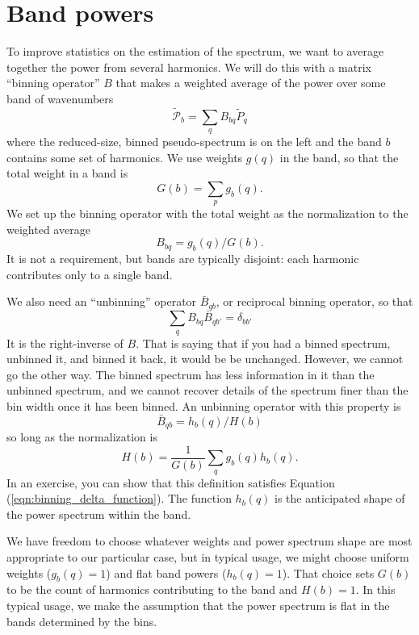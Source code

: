 \section{Band powers} \label{sec:band_powers}
To improve statistics on the estimation of the spectrum, we want to average together the power from several harmonics.  We will do this with a matrix ``binning operator'' $B$ that makes a weighted average of the power over some band of wavenumbers
\begin{equation}
  \tilde {\mathcal P}_b  = \sum_q B_{bq} \tilde P_q
\end{equation}
where the reduced-size, binned pseudo-spectrum is on the left and the band $b$ contains some set of harmonics.   We use weights $g(q)$ in the band, so that the total weight in a band is
\begin{equation}
  G(b) = \sum_{p} g_b(q).
\end{equation}
We set up the binning operator with the total weight as the normalization to the weighted average
\begin{equation}
  B_{bq} = g_b(q)/G(b).
\end{equation}
It is not a requirement, but bands are typically disjoint: each harmonic contributes only to a single band.

We also need an ``unbinning'' operator $\bar B_{qb}$, or reciprocal binning operator, so that
\begin{equation}
  \sum_q B_{bq}\bar B_{qb'} = \delta_{bb'}  \label{eqn:binning_delta_function}
\end{equation}
It is the right-inverse of $B$.  That is saying that if you had a binned spectrum, unbinned it, and binned it back, it would be be unchanged.  However, we cannot go the other way.  The binned spectrum has less information in it than the unbinned spectrum, and we cannot recover details of the spectrum finer than the bin width once it has been binned.    An unbinning operator with this property is
\begin{equation}
  \bar B_{qb} = h_b(q)/H(b)
\end{equation}
so long as the normalization is 
\begin{equation}
  H(b) = \frac{1}{G(b)}\sum_q g_b(q)h_b(q).
\end{equation}
In an exercise, you can show that this definition satisfies Equation (\ref{eqn:binning_delta_function}).  The function $h_b(q)$ is the anticipated shape of the power spectrum within the band.

We have freedom to choose whatever weights and power spectrum shape are most appropriate to our particular case, but in typical usage, we might choose uniform weights ($g_b(q) = 1$) and flat band powers ($h_b(q)=1$).  That choice sets $G(b)$ to be the count of harmonics contributing to the band and $H(b) = 1$.  In this typical usage, we make the assumption that the power spectrum is flat in the bands determined by the bins.

